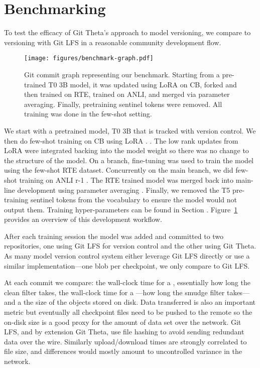 \section{Benchmarking}

To test the efficacy of Git Theta's approach to model versioning, we compare to versioning with Git LFS in a reasonable community development flow.

\begin{figure}[ht]
\vskip 0.2in
\begin{center}
\centerline{\texttt{[image: figures/benchmark-graph.pdf]}}
\caption{Git commit graph representing our benchmark. Starting from a pre-trained T0 3B model, it was updated using LoRA on CB, forked and then trained on RTE, trained on ANLI, and merged via parameter averaging. Finally, pretraining sentinel tokens were removed. All training was done in the few-shot setting.}
\label{fig:commit-graph}
\end{center}
\vskip -0.2in
\end{figure}

We start with a pretrained model, T0 3B  that is tracked with version control. We then do few-shot training on CB  using LoRA . . The low rank updates from LoRA were integrated backing into the model weight so there was no change to the structure of the model. On a branch, fine-tuning was used to train the model using the few-shot RTE  dataset. Concurrently on the main branch, we did few-shot training on ANLI r-1 . The RTE trained model was merged back into main-line development using parameter averaging \cite{}. Finally, we removed the T5 \cite{} pre-training sentinel tokens from the vocabulary to ensure the model would not output them. Training hyper-parameters can be found in Section . Figure~\ref{fig:commit-graph} provides an overview of this development workflow.

After each training session the model was added and committed to two repositories, one using Git LFS for version control and the other using Git Theta. As many model version control system either leverage Git LFS directly or use a similar implementation---one blob per checkpoint, we only compare to Git LFS.

At each commit we compare: the wall-clock time for a , essentially how long the clean filter takes, the wall-clock time for a ---how long the smudge filter takes---and a the size of the objects stored on disk. Data transferred is also an important metric but eventually all checkpoint files need to be pushed to the remote so the on-disk size is a good proxy for the amount of data set over the network. Git LFS, and by extension Git Theta, use file hashing to avoid sending redundant data over the wire. Similarly upload/download times are strongly correlated to file size, and differences would mostly amount to uncontrolled variance in the network.

